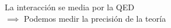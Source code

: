\documentclass[preview]{standalone}
\begin{document}
\begin{center}
La interacción se media por la QED \\ $\implies$ Podemos medir la precisión de la teoría
\end{center}
\end{document}
